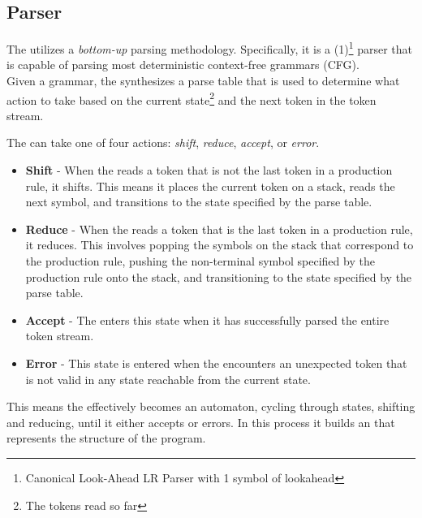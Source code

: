 \subsection{Parser}

The \lang{} \parser{} utilizes a \textit{bottom-up} parsing methodology.
Specifically, it is a \parserType{}(1)\footnote{Canonical Look-Ahead LR Parser with 1
symbol of lookahead} parser that is capable of parsing most deterministic
context-free grammars (CFG). \\

Given a grammar, the \parser{} synthesizes a parse table that is used to
determine what action to take based on the current state\footnote{The tokens
read so far} and the next token in the token stream. 

The \parser{} can take one of four actions: \textit{shift}, \textit{reduce},
\textit{accept}, or \textit{error}. 

\begin{itemize} 
  
  \item \textbf{Shift} - When the \parser{} reads a token that is not the last token
    in a production rule, it shifts. This means it places the current token on a
    stack, reads the next symbol, and transitions to the state specified by the parse
    table.

  \item \textbf{Reduce} - When the \parser{} reads a token that is the last token in
    a production rule, it reduces. This involves popping the symbols on the stack
    that correspond to the production rule, pushing the non-terminal symbol specified
    by the production rule onto the stack, and transitioning to the state specified
    by the parse table.

  \item \textbf{Accept} - The \parser{} enters this state when it has successfully
    parsed the entire token stream.

  \item \textbf{Error} - This state is entered when the \parser{} encounters an
    unexpected token that is not valid in any state reachable from the current state.

\end{itemize}

This means the \parser{} effectively becomes an automaton, cycling through states,
shifting and reducing, until it either accepts or errors. In this process it builds an
\ast{} that represents the structure of the program.

